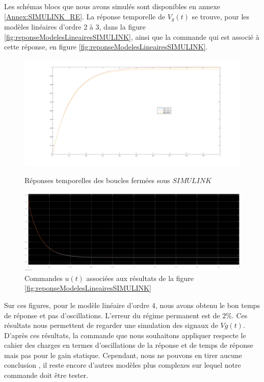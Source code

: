 Les schémas blocs que nous avons simulés sont disponibles en annexe \ref{Annex:SIMULINK_RE}. La réponse temporelle de $V_g(t)$ se trouve, pour les modèles linéaires d'ordre 2 à 3, dans la figure \ref{fig:reponseModelesLineairesSIMULINK}, ainsi que la commande qui est associé à cette réponse, en figure \ref{fig:reponseModelesLineairesSIMULINK}.
\begin{figure}[!ht]
\centering
\includegraphics[scale=.3]{./III/figure/res_SIMULINK.png}
\caption{Réponses temporelles des boucles fermées sous $SIMULINK$\label{fig:reponseModelesLineairesSIMULINK}}
\includegraphics[scale=.4]{./III/figure/commande-u-ML_ordre2-3-4.pdf}
\caption{Commandes $u(t)$ associées aux résultats de la figure \ref{fig:reponseModelesLineairesSIMULINK}\label{fig:commandesML-1V}}
\end{figure}
Sur ces figures, pour le modèle linéaire d'ordre 4, nous avons obtenu le bon temps de réponse et pas d'oscillations. L'erreur du régime permanent est de $2\%$.
Ces résultats nous permettent de regarder une simulation des signaux de $Vg(t)$. D'après ces résultats, la commande que nous souhaitons appliquer respecte le cahier des charges en termes d'oscillations de la réponse et de temps de réponse mais pas pour le gain statique. Cependant, nous ne pouvons en tirer aucune conclusion , il reste encore d'autres modèles plus complexes sur lequel notre commande doit être tester.


